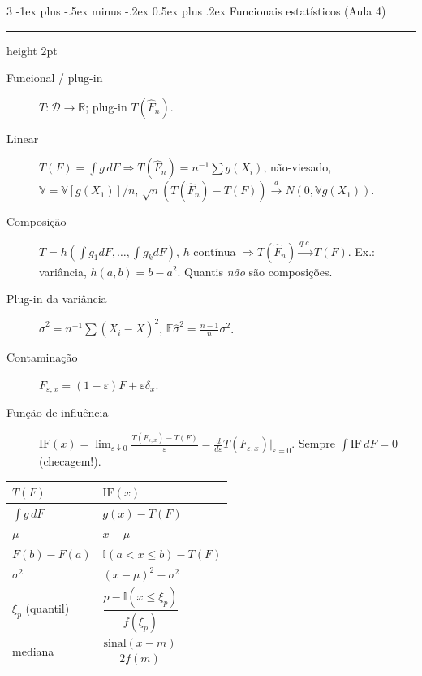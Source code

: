 \documentclass[10pt,landscape]{article}
\makeatletter
\newcommand{\E}{\mathbb{E}}
\newcommand{\V}{\mathbb{V}}
\newcommand{\I}{\mathbb{I}}
\newcommand{\R}{\mathbb{R}}
\newcommand{\IF}{\textrm{IF}}
\newcommand{\Fn}{\hat{F}_n}
\newcommand{\qc}{\xrightarrow{q.c.}}
\newcommand{\dto}{\xrightarrow{d}}
\renewcommand{\section}{\@startsection{section}{1}{0mm}%
                                {-1ex plus -.5ex minus -.2ex}%
                                {0.5ex plus .2ex}%
                                {\normalfont\small\bfseries}}
\newcommand{\secrule}{\smallskip \hrule height 2pt \smallskip}
\makeatother
\begin{document}
\begin{multicols}{3}
\section{Funcionais estatísticos (Aula 4)}\secrule
\begin{description}
  \item[Funcional / plug-in] $T:\mathcal D\to\R$; plug-in $T(\Fn)$.
  \item[Linear] $T(F)=\int g\,dF\Rightarrow T(\Fn)=n^{-1}\sum g(X_i)$, não-viesado, $\V=\V[g(X_1)]/n$, $\sqrt n(T(\Fn)-T(F))\dto N(0,\V g(X_1))$.
  \item[Composição] $T=h(\int g_1dF,\dots,\int g_kdF)$, $h$ contínua $\Rightarrow T(\Fn)\qc T(F)$. Ex.: variância, $h(a,b)=b-a^2$. Quantis \emph{não} são composições.
  \item[Plug-in da variância] $\hat\sigma^2=n^{-1}\sum(X_i-\bar X)^2$, $\E\hat\sigma^2=\frac{n-1}n\sigma^2$.
  \item[Contaminação] $F_{\varepsilon,x}=(1-\varepsilon)F+\varepsilon\delta_x$.
  \item[Função de influência] $\IF(x)=\lim_{\varepsilon\downarrow0}\frac{T(F_{\varepsilon,x})-T(F)}{\varepsilon}=\frac{d}{d\varepsilon}T(F_{\varepsilon,x})\big|_{\varepsilon=0}$. Sempre $\int\IF\,dF=0$ (checagem!).
\end{description}

\begin{center}
\begin{tabular}{ll}
\toprule
$T(F)$ & $\IF(x)$ \\
\midrule
$\int g\,dF$ & $g(x)-T(F)$ \\
$\mu$ & $x-\mu$ \\
$F(b)-F(a)$ & $\I(a<x\le b)-T(F)$ \\
$\sigma^2$ & $(x-\mu)^2-\sigma^2$ \\
$\xi_p$ (quantil) & $\dfrac{p-\I(x\le\xi_p)}{f(\xi_p)}$ \\
mediana & $\dfrac{\textrm{sinal}(x-m)}{2f(m)}$ \\
\bottomrule
\end{tabular}
\end{center}


\end{multicols}
\end{document}
